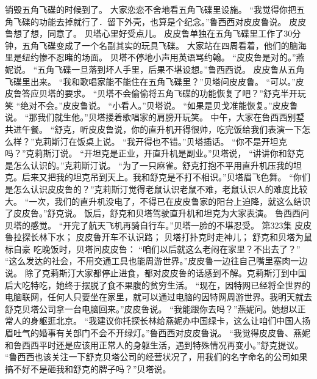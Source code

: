 \documentclass[a4paper,12pt,UTF8,twoside]{ctexbook}
\begin{document}
        销毁五角飞碟的时候到了。  
        大家恋恋不舍地看五角飞碟里设施。  
        “我觉得你把五角飞碟的功能去掉就行了．留下外壳，也算是个纪念。”鲁西西对皮皮鲁说。  
        皮皮鲁想了想，同意了。  
        贝塔心里好受点儿。  
        皮皮鲁单独在五角飞碟里工作了30分钟，五角飞碟变成了一个名副其实的玩具飞碟。  
        大家站在四周看着，他们的脑海里是纽约惨不忍睹的场面。  
        贝塔不停地小声用英语骂约翰。  
        “皮皮鲁是对的。”燕妮说。  
        “五角飞碟一旦落到坏人手里，后果不堪设想。”鲁西西说。  
        皮皮鲁从五角飞碟里出来。        
        “我和歌唱家能不能住在五角飞碟里？”贝塔问皮皮鲁。  
        “可以。”皮皮鲁答应贝塔的要求。  
        “贝塔不会偷偷将五角飞碟的功能恢复了吧？”舒克半开玩笑  
      “绝对不会。”皮皮鲁说。  
      “小看人。”贝塔说。  
      “如果是贝戈准能恢复。”皮皮鲁说。  
      “那我们就生他。”贝塔搂着歌唱家的肩膀开玩笑。  
        中午，大家在鲁西西别墅共进午餐。  
        “舒克，听皮皮鲁说，你的直升机开得很帅，吃完饭给我们表演一下怎么样？”克莉斯汀在饭桌上说。  
        “我开得也不错。”贝塔插话。  
        “你不是开坦克吗？”克莉斯汀说。  
        “开坦克是正业，开直升机是副业。”贝塔说，  
        “讲讲你和舒克是怎么认识的。”克莉斯汀说。  
        “为了一只麻雀。舒克打抱不平用直升机压我的坦克。后来又把我的坦克吊到天上。我和舒克是不打不相识。”贝塔眉飞色舞。  
        “你们是怎么认识皮皮鲁的？”克莉斯汀觉得老鼠认识老鼠不难，老鼠认识人的难度比较大。  
        “一次，我们的直升机没电了，不得已在皮皮鲁家的阳台上迫降，就这么结识了皮皮鲁。”舒克说。  
        饭后，舒克和贝塔驾驶直升机和坦克为大家表演。  
        鲁西西问贝塔的感觉。  
        “开完了航天飞机再骑自行车。”贝塔一脸的不堪忍受。          第323集  
        皮皮鲁拉探长林下水；  
        皮皮鲁开车不认识路；  
        贝塔打扑克时走神儿；  
        舒克和贝塔为鼠标自豪   
        吃晚饭时，贝塔问皮皮鲁：  
        “咱们以后就这么老闷在家里？不出去了？”  
        “这么发达的社会，不用交通工具也能周游世界。”皮皮鲁一边往自己嘴里塞肉一边说。  
        除了克莉斯汀大家都停止进食，都对皮皮鲁的话感到不解。克莉斯汀到中国后大吃特吃，她终于摆脱了食不果腹的贫穷生活。  
        “现在，因特网已经将全世界的电脑联网，任何人只要坐在家里，就可以通过电脑的因特网周游世界。我明天就去舒克贝塔公司拿一台电脑回来。”皮皮鲁说。        
        “我能跟你去吗？”燕妮问。她想以正常人的身躯逛北京。  
        “我建议你托探长林给燕妮办中国绿卡，这么让咱们中国人扬眉吐气的婚事有关部门不会不开绿灯。”鲁西西对皮皮鲁说。  
        “我觉得皮皮鲁、燕妮和鲁西西平时还是应该用正常人的身躯生活，遇到特殊情况再变小。”舒克提议。  
        “鲁西西也该关注一下舒克贝塔公司的经营状况了，用我们的名字命名的公司如果搞不好不是砸我和舒克的牌子吗？”贝塔说。  
\end{document}
